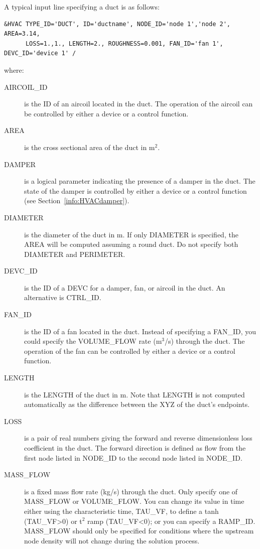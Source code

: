 \documentclass[11pt]{book}
\begin{document}
A typical input line specifying a duct is as follows:
\begin{lstlisting}
&HVAC TYPE_ID='DUCT', ID='ductname', NODE_ID='node 1','node 2', AREA=3.14,
      LOSS=1.,1., LENGTH=2., ROUGHNESS=0.001, FAN_ID='fan 1', DEVC_ID='device 1' /
\end{lstlisting}
where:
\begin{description}
\item[{\ct AIRCOIL\_ID}] is the {\ct ID} of an aircoil located in the duct.  The operation of the aircoil can be controlled by either a device or a control function.
\item[{\ct AREA}] is the cross sectional area of the duct in m$^2$.
\item[{\ct DAMPER}] is a logical parameter indicating the presence of a damper in the duct. The state of the damper is controlled by either a device or a control function (see Section~\ref{info:HVACdamper}).
\item[{\ct DIAMETER}] is the diameter of the duct in m.  If only {\ct DIAMETER} is specified, the {\ct AREA} will be computed assuming a round duct.  Do not specify both {\ct DIAMETER} and {\ct PERIMETER}.
\item[{\ct DEVC\_ID}]  is the {\ct ID} of a {\ct DEVC} for a damper, fan, or aircoil in the duct. An alternative is {\ct CTRL\_ID}.
\item[{\ct FAN\_ID}] is the {\ct ID} of a fan located in the duct. Instead of specifying a {\ct FAN\_ID}, you could specify the {\ct VOLUME\_FLOW} rate (m$^3$/s) through the duct. The operation of the fan can be controlled by either a device or a control function.
\item[{\ct LENGTH}] is the {\ct LENGTH} of the duct in m.  Note that {\ct LENGTH} is not computed automatically as the difference between the {\ct XYZ} of the duct's endpoints.
\item[{\ct LOSS}] is a pair of real numbers giving the forward and reverse dimensionless loss coefficient in the duct.  The forward direction is defined as flow from the first node listed in {\ct NODE\_ID} to the second node listed in {\ct NODE\_ID}.
\item[{\ct MASS\_FLOW}] is a fixed mass flow rate (kg/s) through the duct.  Only specify one of {\ct MASS\_FLOW} or {\ct VOLUME\_FLOW}.  You can change its value in time either using the characteristic time, {\ct TAU\_VF},  to define a tanh ({\ct TAU\_VF}>0) or t$^2$ ramp ({\ct TAU\_VF}<0); or you can specify a {\ct RAMP\_ID}.  {\ct MASS\_FLOW} should only be specified for conditions where the upstream node density will not change during the solution process.

\end{description}
\end{document}
